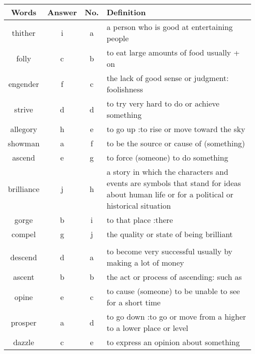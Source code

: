 \documentclass[a4paper]{article}
\begin{document}
\begin{center}
\begin{tabular}{|c|c|c|m{}|}
\hline
Words & Answer & No. & Definition \\
\hline
thither & i & a &  a person who is good at entertaining people\\
\hline
folly & c & b &  to eat large amounts of food usually + on \\
\hline
engender & f & c &  the lack of good sense or judgment: foolishness \\
\hline
strive & d & d &  to try very hard to do or achieve something \\
\hline
allegory & h & e &  to go up :to rise or move toward the sky \\
\hline
showman & a & f &  to be the source or cause of (something) \\
\hline
ascend & e & g &  to force (someone) to do something \\
\hline
brilliance & j & h &  a story in which the characters and events are symbols that stand for ideas about human life or for a political or historical situation \\
\hline
gorge & b & i &  to that place :there \\
\hline
compel & g & j &  the quality or state of being brilliant \\
\hline
 & & & \\
\hline
descend & d & a &  to become very successful usually by making a lot of money \\
\hline
ascent & b & b &  the act or process of ascending: such as\\
\hline
opine & e & c &  to cause (someone) to be unable to see for a short time \\
\hline
prosper & a & d &  to go down :to go or move from a higher to a lower place or level \\
\hline
dazzle & c & e &  to express an opinion about something \\
\hline
\end{tabular}
\end{center}
\end{document}
